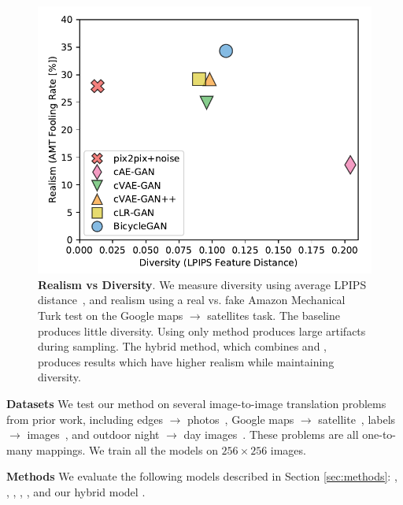 \begin{figure}
\begin{minipage}[b]{0.54\linewidth}
  \end{minipage}
  \begin{minipage}[b]{0.45\linewidth}
  \includegraphics[width=\linewidth]{imgs/real_div.pdf} 
  \end{minipage}
  \vspace{-4mm}
  \caption{\small \textbf{Realism vs Diversity}. We measure diversity using average LPIPS distance~\cite{zhang2018unreasonable}, and realism using a real vs. fake Amazon Mechanical Turk test on the Google maps $\rightarrow$ satellites task. The \ppn baseline produces little diversity. Using only \cae method produces large artifacts during sampling. The hybrid \bicycle method, which combines \cvaegan and \cinfogan, produces results which have higher realism while maintaining diversity.
  }
  \vspace{-5mm}
  \label{fig:real_vs_div}
\end{figure}


{\bf Datasets} We test our method on several image-to-image translation problems from prior work, including edges $\rightarrow$ photos~\citep{yu2014fine,zhu2016generative}, Google maps $\rightarrow$ satellite~\citep{isola2016image}, labels $\rightarrow$ images~\citep{Cordts2016Cityscapes}, and outdoor night $\rightarrow$ day images~\citep{Laffont14}. These problems are all one-to-many mappings. We train all the models on $256\times 256$ images.


{\bf Methods} We evaluate the following models described in Section \ref{sec:methods}: \ppn, \cae, \cvaegan, \cvaeganp, \cinfogan, and our hybrid model \bicycle.

